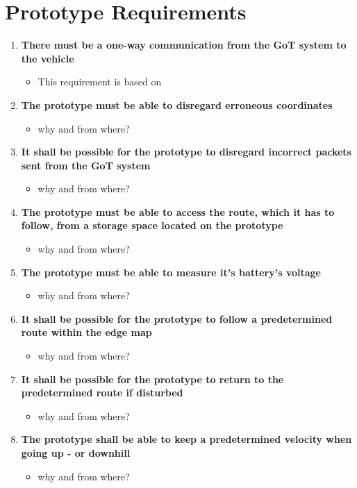 \chapter{Prototype Requirements}

\begin{enumerate}
\item \textbf{There must be a one-way communication from the GoT system to the vehicle}
	\begin{itemize}
	\item[] This requirement is based on 
	\end{itemize}
\item \textbf{The prototype must be able to disregard erroneous coordinates}
	\begin{itemize}
	\item[] why and from where?
	\end{itemize}
\item \textbf{It shall be possible for the prototype to disregard incorrect packets sent from the GoT system}
	\begin{itemize}
	\item[] why and from where?
	\end{itemize}
\item \textbf{The prototype must be able to access the route, which it has to follow, from a storage space located on the prototype}
	\begin{itemize}
	\item[] why and from where?
	\end{itemize}
\item \textbf{The prototype must be able to measure it's battery's voltage}
	\begin{itemize}
	\item[] why and from where?
	\end{itemize}
\item \textbf{It shall be possible for the prototype to follow a predetermined route within the edge map}
	\begin{itemize}
	\item[] why and from where?
	\end{itemize}
\item \textbf{It shall be possible for the prototype to return to the predetermined route if disturbed}
	\begin{itemize}
	\item[] why and from where?
	\end{itemize}
\item \textbf{The prototype shall be able to keep a predetermined velocity when going up - or downhill}
	\begin{itemize}
	\item[] why and from where?
	\end{itemize}
\end{enumerate}
